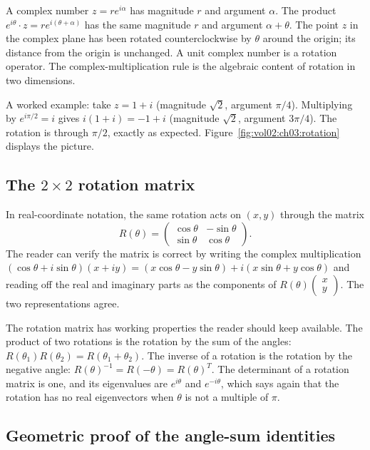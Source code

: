 A complex number $z = r e^{i\alpha}$ has magnitude $r$ and
argument $\alpha$. The product $e^{i\theta} \cdot z = r e^{i(\theta
+ \alpha)}$ has the same magnitude $r$ and argument $\alpha +
\theta$. The point $z$ in the complex plane has been rotated
counterclockwise by $\theta$ around the origin; its distance from
the origin is unchanged. A unit complex number is a rotation
operator. The complex-multiplication rule is the algebraic content
of rotation in two dimensions.

A worked example: take $z = 1 + i$ (magnitude $\sqrt{2}$, argument
$\pi/4$). Multiplying by $e^{i\pi/2} = i$ gives $i(1 + i) = -1 +
i$ (magnitude $\sqrt{2}$, argument $3\pi/4$). The rotation is
through $\pi/2$, exactly as expected. Figure~\ref{fig:vol02:ch03:rotation}
displays the picture.



\subsection{The $2\times 2$ rotation matrix}

In real-coordinate notation, the same rotation acts on $(x, y)$
through the matrix
\[
R(\theta) = \begin{pmatrix} \cos\theta & -\sin\theta \\ \sin\theta & \cos\theta \end{pmatrix}.
\]
The reader can verify the matrix is correct by writing the
complex multiplication $(\cos\theta + i\sin\theta)(x + iy) =
(x\cos\theta - y\sin\theta) + i(x\sin\theta + y\cos\theta)$ and
reading off the real and imaginary parts as the components of
$R(\theta)\begin{pmatrix}x \\ y\end{pmatrix}$. The two
representations agree.

The rotation matrix has working properties the reader should
keep available. The product of two rotations is the rotation by
the sum of the angles: $R(\theta_{1}) R(\theta_{2}) = R(\theta_{1}
+ \theta_{2})$. The inverse of a rotation is the rotation by the
negative angle: $R(\theta)^{-1} = R(-\theta) = R(\theta)^{T}$. The
determinant of a rotation matrix is one, and its eigenvalues are
$e^{i\theta}$ and $e^{-i\theta}$, which says again that the
rotation has no real eigenvectors when $\theta$ is not a multiple
of $\pi$.

\subsection{Geometric proof of the angle-sum identities}

